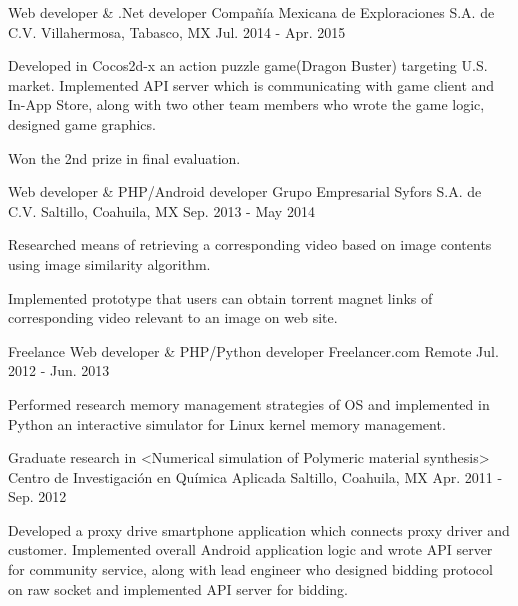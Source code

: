 \begin{cventries}

\cventry
{Web developer \& .Net developer} %
{Compañía Mexicana de Exploraciones S.A. de C.V.} %
{Villahermosa, Tabasco, MX} %
{Jul. 2014 - Apr. 2015} %
{ %
	\begin{cvitems}
		\item {Developed in Cocos2d-x an action puzzle game(Dragon Buster) targeting U.S. market. Implemented API server which is communicating with game client and In-App Store, along with two other team members who wrote the game logic, designed game graphics.}
		\item {Won the 2nd prize in final evaluation.}
	\end{cvitems}
}


\cventry
{Web developer \& PHP/Android developer} %
{Grupo Empresarial Syfors S.A. de C.V.} %
{Saltillo, Coahuila, MX} %
{Sep. 2013 - May 2014} %
{ %
	\begin{cvitems}
	\item {Researched means of retrieving a corresponding video based on image contents using image similarity algorithm.}
	\item {Implemented prototype that users can obtain torrent magnet links of corresponding video relevant to an image on web site.}
	\end{cvitems} 
}


\cventry
{Freelance Web developer \& PHP/Python developer} %
{Freelancer.com} %
{Remote} %
{Jul. 2012 - Jun. 2013} %
{ %
	\begin{cvitems}
	\item {Performed research memory management strategies of OS and implemented in Python an interactive simulator for Linux kernel memory management.}
	\end{cvitems}
}


\cventry
{Graduate research in <Numerical simulation of Polymeric material synthesis>} %
{Centro de Investigación en Química Aplicada} %
{Saltillo, Coahuila, MX} %
{Apr. 2011 - Sep. 2012} %
{ %
	\begin{cvitems}
	\item {Developed a proxy drive smartphone application which connects proxy driver and customer. Implemented overall Android application logic and wrote API server for community service, along with lead engineer who designed bidding protocol on raw socket and implemented API server for bidding.}
	\end{cvitems}
}


\end{cventries}
